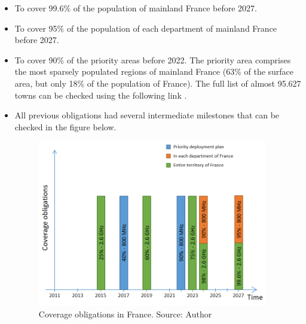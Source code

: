 {\begin{itemize}
\begin{itemize}
	\item To cover 99.6$\%$  of the population of mainland France before 2027.\par

	\item To cover 95$\%$  of the population of each department of mainland France before 2027.\par

	\item To cover 90$\%$  of the priority areas before 2022. The priority area comprises the most sparsely populated regions of mainland France (63$\%$  of the surface area, but only 18$\%$  of the population of France). The full list of almost 95.627 towns can be checked using the following link \cite{2-24}.\par

	\item All previous obligations had several intermediate milestones that can be checked in the figure below.




\begin{figure}[H]
	\begin{Center}
		\includegraphics[width=0.95\textwidth]{./media/image12.png}
		\caption{Coverage obligations in France. Source: Author}
	\end{Center}
\end{figure}




\end{itemize}
\end{itemize}}
